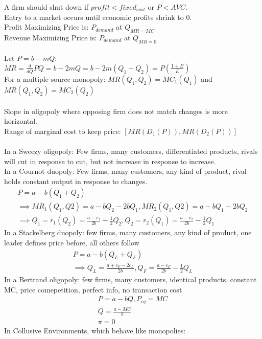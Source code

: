 \documentclass[nobib,fleqn,8pt]{article}
\begin{document}
A firm should shut down if $profit<fixed_{cost}$ or $P<AVC$.\\ Entry to a market occurs
until economic profits shrink to 0.\\ Profit Maximizing Price is: $P_{demand}$
at $Q_{MR=MC}$\\ Revenue Maximizing Price is: $P_{demand}$ at $Q_{MR=0}$\\~\\
Let $P = b-mQ$:\\ $MR = \frac{d}{dQ}PQ = b-2mQ = b-2m(Q_1+Q_2) =
    P\left(\frac{1+E}{E}\right)$\\ For a multiple source monopoly: $MR(Q_1,Q_2) =
    MC_1(Q_1)$ and $MR(Q_1,Q_2) = MC_2(Q_2)$\\~\\ Slope in oligopoly where opposing
firm does not match changes is more horizontal.\\ Range of marginal cost to
keep price: $[MR(D_1(P)),MR(D_2(P))]$\\~\\ 
In a Sweezy oligopoly:
Few firms, many customers, differentiated products, rivals will cut in response to cut, but not increase in response to increase.\\
In a Cournot duopoly:
Few firms, many customers, any kind of product, rival holds constant output in response to changes.
\begin{eqnarray*}
    P=a-b(Q_1+Q_2)\\
    \implies MR_1(Q_1,Q2) = a-bQ_2-2bQ_1, MR_2(Q_1,Q2) = a-bQ_1-2bQ_2\\
    \implies Q_1 = r_1(Q_2)= \frac{a-c_1}{2b}-\frac{1}{2}Q_2,Q_2 = r_2(Q_1)= \frac{a-c_2}{2b}-\frac{1}{2}Q_1
\end{eqnarray*}
In a Stackelberg duopoly: few firms, many customers, any kind of product, one leader defines price before, all others follow 
\begin{eqnarray*}
    P = a-b(Q_L+Q_F)\\
    \implies Q_L = \frac{a+c_F-2c_L}{2b}, Q_F= \frac{a-c_F}{2b}-\frac{1}{2}Q_L
\end{eqnarray*}
In a Bertrand oligopoly: few firms, many customers, identical products, constant MC, price comepetition, perfect info, no transaction cost
\begin{eqnarray*}
    P = a-bQ, P_{eq} = MC\\
    Q = \frac{a-MC}{b}\\
    \pi = 0
\end{eqnarray*}
In Collusive Environments, which behave like monopolies:
\end{document}
